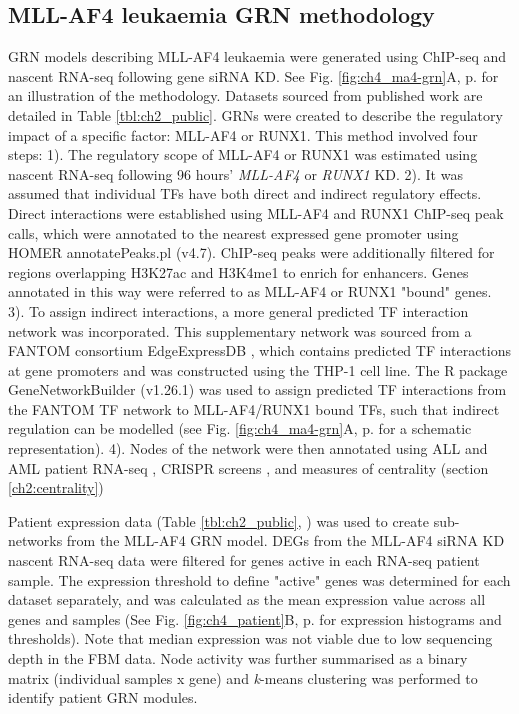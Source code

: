 \subsection{\label{ch2:ma4-grn}MLL-AF4 leukaemia GRN methodology}

GRN models describing MLL-AF4 leukaemia were generated using ChIP-seq and nascent RNA-seq following gene siRNA KD. See Fig. \ref{fig:ch4_ma4-grn}A, p.\pageref{fig:ch4_ma4-grn} for an illustration of the methodology. Datasets sourced from published work are detailed in Table \ref{tbl:ch2_public}. GRNs were created to describe the regulatory impact of a specific factor: MLL-AF4 or RUNX1. This method involved four steps: 1). The regulatory scope of MLL-AF4 or RUNX1 was estimated using nascent RNA-seq following 96 hours' \textit{MLL-AF4} or \textit{RUNX1} KD. 2). It was assumed that individual TFs have both direct and indirect regulatory effects. Direct interactions were established using MLL-AF4 and RUNX1 ChIP-seq peak calls, which were annotated to the nearest expressed gene promoter using HOMER annotatePeaks.pl (v4.7). ChIP-seq peaks were additionally filtered for regions overlapping H3K27ac and H3K4me1 to enrich for enhancers. Genes annotated in this way were referred to as MLL-AF4 or RUNX1 "bound" genes. 3). To assign indirect interactions, a more general predicted TF interaction network was incorporated. This supplementary network was sourced from a FANTOM consortium EdgeExpressDB \citep{the_fantom_consortium_and_the_riken_omics_science_center_transcriptional_2009, severin_fantom4_2009}, which contains predicted TF interactions at gene promoters and was constructed using the THP-1 cell line. The R package GeneNetworkBuilder (v1.26.1) was used to assign predicted TF interactions from the FANTOM TF network to MLL-AF4/RUNX1 bound TFs, such that indirect regulation can be modelled (see Fig. \ref{fig:ch4_ma4-grn}A, p.\pageref{fig:ch4_ma4-grn} for a schematic representation). 4). Nodes of the network were then annotated using ALL and AML patient RNA-seq \citep{agraz-doblas_unraveling_2019, the_cancer_genome_atlas_research_network_genomic_2013, obyrne_discovery_2019}, CRISPR screens \citep{tzelepis_crispr_2016, behan_prioritization_2019}, and measures of centrality (section \ref{ch2:centrality}) 

Patient expression data (Table \ref{tbl:ch2_public}, \cite{agraz-doblas_unraveling_2019, the_cancer_genome_atlas_research_network_genomic_2013, obyrne_discovery_2019}) was used to create sub-networks from the MLL-AF4 GRN model. DEGs from the MLL-AF4 siRNA KD nascent RNA-seq data were filtered for genes active in each RNA-seq patient sample. The expression threshold to define "active" genes was determined for each dataset separately, and was calculated as the mean expression value across all genes and samples (See Fig. \ref{fig:ch4_patient}B, p.\pageref{fig:ch4_patient} for expression histograms and thresholds). Note that median expression was not viable due to low sequencing depth in the FBM data. Node activity was further summarised as a binary matrix (individual samples x gene) and \textit{k}-means clustering was performed to identify patient GRN modules.

